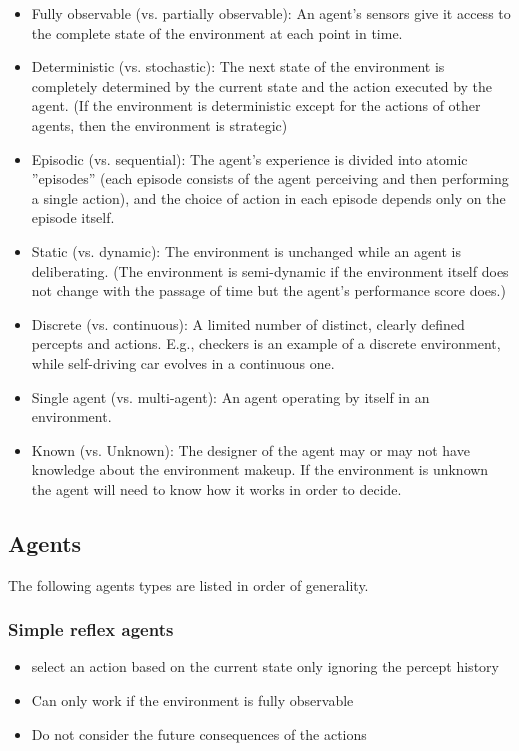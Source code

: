 \begin{itemize}
  \item Fully observable (vs. partially observable): An agent’s
    sensors give it access to the complete state of the
    environment at each point in time.  
  \item Deterministic (vs.  stochastic): The next state of the 
    environment is completely determined by the current state 
    and the action executed by the agent. 
    (If the environment is deterministic except for
    the actions of other agents, then the environment is
    strategic) 
  \item Episodic (vs. sequential): The agent’s
    experience is divided into atomic ”episodes” (each episode
    consists of the agent perceiving and then performing a single
    action), and the choice of action in each episode depends
    only on the episode itself.
  \item Static (vs. dynamic): The environment is unchanged while 
    an agent is deliberating. (The environment is semi-dynamic
    if the environment itself does not change with the passage of
    time but the agent’s performance score does.)
  \item Discrete (vs. continuous): A limited number of distinct,
    clearly defined percepts and actions. E.g., checkers is an example of a discrete environment, while self-driving car evolves
    in a continuous one.
  \item Single agent (vs. multi-agent): An agent operating by itself
    in an environment.
  \item Known (vs. Unknown): The designer of the agent may or
    may not have knowledge about the environment makeup. If
    the environment is unknown the agent will need to know how
    it works in order to decide.
\end{itemize}

\subsection{Agents}

The following agents types are listed in order of generality.

\subsubsection{Simple reflex agents}
\begin{itemize}
  \item select an action based on the current state
    only ignoring the percept history
  \item Can only work if the environment is fully observable
  \item Do not consider the future consequences of the actions
\end{itemize}

